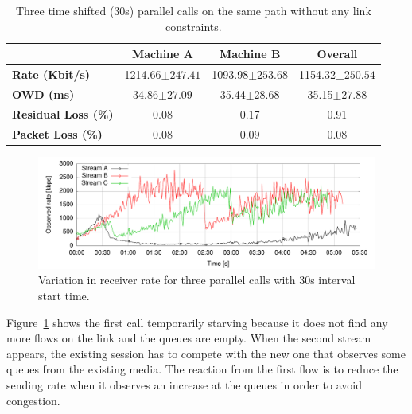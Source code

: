 \begin{table}[h]
\begin{center}
	\begin{tabular}{| l | c | c | c |}
	\hline
    	 & Machine A & Machine B & Overall \\ \hline
	\textbf{Rate (Kbit/s)} & 1214.66$\pm247.41$ & 1093.98$\pm253.68$ & 1154.32$\pm250.54$\\\hline
	\textbf{OWD (ms)} & 34.86$\pm27.09$ & 35.44$\pm28.68$ & 35.15$\pm27.88$\\\hline
	\textbf{Residual Loss (\%)} & 0.08 & 0.17 & 0.91\\\hline
	\textbf{Packet Loss (\%)} & 0.08 & 0.09 & 0.08\\\hline
	\end{tabular}
    \caption[Three time shifted (30s) parallel calls on the same path without any link constraints]{Three time shifted (30s) parallel calls on the same path without any link constraints.}
    \label{fig:three_no_dummynet_async}
\end{center}
\end{table}

\begin{figure}[h]
  \centering
    \includegraphics[width=1\textwidth]{./figures/async_three-calls.pdf}
      \caption[Variation in receiver rate for three parallel calls with 30s interval start time]{Variation in receiver rate for three parallel calls with 30s interval start time.}
	\label{fig:three_parallel_async}
\end{figure}

Figure~\ref{fig:three_parallel_async} shows the first call temporarily starving because it does not find any more flows on the link and the queues are empty. When the second stream appears, the existing session has to compete with the new one that observes some queues from the existing media. The reaction from the first flow is to reduce the sending rate when it observes an increase at the queues in order to avoid congestion. 

